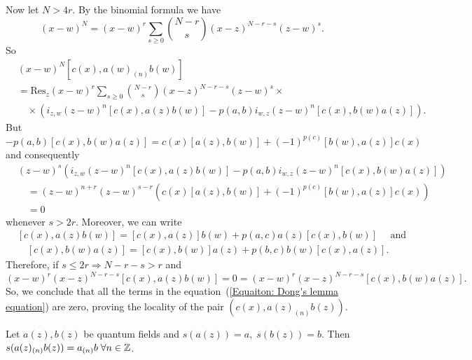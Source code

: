Now let $N>4r$. By the binomial formula we have
\begin{equation}
    (x-w)^N=(x-w)^r\sum_{s\geq0}\binom{N-r}{s}(x-z)^{N-r-s}(z-w)^s.
\end{equation}
So
\begin{equation}\label{Equaiton: Dong's lemma equation}
\begin{split}
     &(x-w)^N[c(x),a(w)_{(n)}b(w)]\\
     &=\text{Res}_z(x-w)^{r}\sum_{s\geq0}\binom{N-r}{s}(x-z)^{N-r-s}(z-w)^s\times\\
     &\quad\times(i_{z,w}(z-w)^n[c(x),a(z)b(w)]-p(a,b)i_{w,z}(z-w)^n[c(x),b(w)a(z)]).
\end{split}
\end{equation}
But 
\begin{equation}
    [c(x),a(z)b(w)]-p(a,b)[c(x),b(w)a(z)]=c(x)[a(z),b(w)]+(-1)^{p(c)}[b(w),a(z)]c(x)
\end{equation}
and consequently 
\begin{equation}
\begin{split}
    &(z-w)^s(i_{z,w}(z-w)^n[c(x),a(z)b(w)]-p(a,b)i_{w,z}(z-w)^n[c(x),b(w)a(z)])\\
    &\quad=(z-w)^{n+r}(z-w)^{s-r}(c(x)[a(z),b(w)]+(-1)^{p(c)}[b(w),a(z)]c(x))\\
    &\quad=0
\end{split}
\end{equation}
whenever $s>2r$. Moreover, we can write
\begin{equation}
\begin{split}
     &[c(x),a(z)b(w)]=[c(x),a(z)]b(w)+p(a,c)a(z)[c(x),b(w)]\quad\text{ and}\\
     &\quad [c(x),b(w)a(z)]=[c(x),b(w)]a(z)+p(b,c)b(w)[c(x),a(z)].
\end{split}
\end{equation}
Therefore, if $s\leq 2r\Rightarrow N-r-s>r$ and 
\begin{equation}
    (x-w)^r(x-z)^{N-r-s}[c(x),a(z)b(w)]=0=(x-w)^r(x-z)^{N-r-s}[c(x),b(w)a(z)].
\end{equation}
So, we conclude that all the terms in the equation~(\ref{Equaiton: Dong's lemma equation}) are zero, proving the locality of the pair $(c(x),a(z)_{(n)}b(z))$.
\begin{dang}
    \begin{lemma}\label{Lemma: s(a(z)_nb(z))=a_nb}\cite{de2006finite}
        Let $a(z), b(z)$ be quantum fields and $s(a(z))=a,\; s(b(z))=b$. Then $s(a(z)_{(n)}b(z))=a_{(n)}b\;\forall n\in\mathbb{Z}$.
    \end{lemma}
\end{dang}

